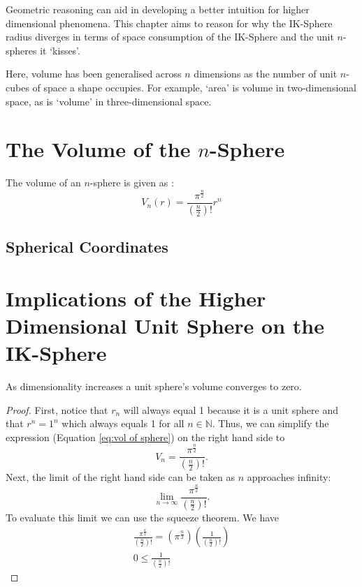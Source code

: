 Geometric reasoning can aid in developing a better intuition for higher dimensional phenomena. This chapter aims to reason for why the IK-Sphere radius diverges in terms of space consumption of the IK-Sphere and the unit $n$-spheres it `kisses'.

\begin{definition}[Volume]
    Here, volume has been generalised across $n$ dimensions as the number of unit $n$-cubes of space a shape occupies. For example, `area' is volume in two-dimensional space, as is `volume' in three-dimensional space. 
\end{definition}

\section{The Volume of the $n$-Sphere}
The volume of an $n$-sphere is given as \cite{mcdonald2003volume}:
\begin{equation}\label{eq:vol of sphere}
    V_n(r)=\frac{\pi^{\frac{n}{2}}}{\left(\frac{n}{2}\right)!}r^n
\end{equation}

\subsection{Spherical Coordinates}

\section{Implications of the Higher Dimensional Unit Sphere on the IK-Sphere}
\begin{lemma}
    As dimensionality increases a unit sphere's volume converges to zero.
\end{lemma}
\begin{proof}
    First, notice that $r_n$ will always equal 1 because it is a unit sphere and that $r^n=1^n$ which always equals 1 for all $n \in \mathbb{N}$. Thus, we can simplify the expression (Equation \ref{eq:vol of sphere}) on the right hand side to
    \begin{equation*}
        V_n=\frac{\pi^{\frac{n}{2}}}{\left(\frac{n}{2}\right)!}.
    \end{equation*}
    Next, the limit of the right hand side can be taken as $n$ approaches infinity:
    \begin{equation*}
        \lim_{n\to\infty}\frac{\pi^{\frac{n}{2}}}{\left(\frac{n}{2}\right)!}.
    \end{equation*}
    To evaluate this limit we can use the squeeze theorem. We have
    \begin{align*}
        \frac{\pi^{\frac{n}{2}}}{\left(\frac{n}{2}\right)!} = \left(\pi^{\frac{n}{2}}\right)\left(\frac{1}{\left(\frac{n}{2}\right)!}\right)\\
        0\leq\frac{1}{\left(\frac{n}{2}\right)!}
    \end{align*}
\end{proof}

